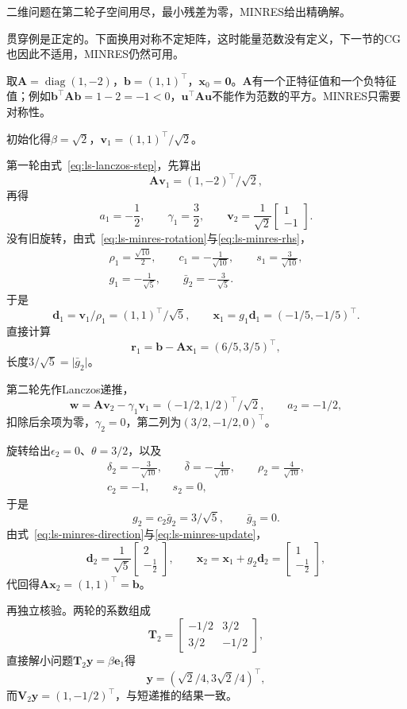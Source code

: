 二维问题在第二轮子空间用尽，最小残差为零，MINRES给出精确解。

贯穿例是正定的。下面换用对称不定矩阵，这时能量范数没有定义，下一节的CG也因此不适用，MINRES仍然可用。

\begin{example}[对称不定矩阵上的MINRES]
\label{ex:ls-minres-indefinite}
取$\bm A=\operatorname{diag}(1,-2)$，$\bm b=(1,1)^\top$，$\bm x_0=\bm0$。$\bm A$有一个正特征值和一个负特征值；例如$\bm b^\top\bm A\bm b=1-2=-1<0$，$\bm u^\top\bm A\bm u$不能作为范数的平方。MINRES只需要对称性。

初始化得$\beta=\sqrt2$，$\bm v_1=(1,1)^\top/\sqrt2$。

第一轮由式~\eqref{eq:ls-lanczos-step}，先算出
\[
 \bm A\bm v_1=(1,-2)^\top/\sqrt2 ,
\]
再得
\[
 a_1=-\frac12,\qquad \gamma_1=\frac32,\qquad \bm v_2=\frac1{\sqrt2}\begin{bmatrix}1\\-1\end{bmatrix}.
\]
没有旧旋转，由式~\eqref{eq:ls-minres-rotation}与\eqref{eq:ls-minres-rhs}，
\[
 \begin{gathered}
 \rho_1=\frac{\sqrt{10}}2,\qquad c_1=-\frac1{\sqrt{10}},\qquad s_1=\frac3{\sqrt{10}},\\
 g_1=-\frac1{\sqrt5},\qquad \bar g_2=-\frac3{\sqrt5} .
 \end{gathered}
\]
于是
\[
 \bm d_1=\bm v_1/\rho_1=(1,1)^\top/\sqrt5,\qquad \bm x_1=g_1\bm d_1=(-1/5,-1/5)^\top .
\]
直接计算
\[
 \bm r_1=\bm b-\bm A\bm x_1=(6/5,3/5)^\top ,
\]
长度$3/\sqrt5=\lvert\bar g_2\rvert$。

第二轮先作Lanczos递推，
\[
 \bm w=\bm A\bm v_2-\gamma_1\bm v_1=(-1/2,1/2)^\top/\sqrt2,\qquad a_2=-1/2 ,
\]
扣除后余项为零，$\gamma_2=0$，第二列为$(3/2,-1/2,0)^\top$。

旋转给出$\epsilon_2=0$、$\theta=3/2$，以及
\[
 \begin{gathered}
 \delta_2=-\frac3{\sqrt{10}},\qquad \bar\delta=-\frac4{\sqrt{10}},\qquad \rho_2=\frac4{\sqrt{10}},\\
 c_2=-1,\qquad s_2=0 ,
 \end{gathered}
\]
于是
\[
 g_2=c_2\bar g_2=3/\sqrt5,\qquad \bar g_3=0 .
\]
由式~\eqref{eq:ls-minres-direction}与\eqref{eq:ls-minres-update}，
\[
 \bm d_2=\frac1{\sqrt5}\begin{bmatrix}2\\-\tfrac12\end{bmatrix},\qquad
 \bm x_2=\bm x_1+g_2\bm d_2=\begin{bmatrix}1\\-\tfrac12\end{bmatrix},
\]
代回得$\bm A\bm x_2=(1,1)^\top=\bm b$。

再独立核验。两轮的系数组成
\[
 \bm T_2=\begin{bmatrix}-1/2&3/2\\3/2&-1/2\end{bmatrix},
\]
直接解小问题$\bm T_2\bm y=\beta\bm e_1$得
\[
 \bm y=(\sqrt2/4,3\sqrt2/4)^\top ,
\]
而$\bm V_2\bm y=(1,-1/2)^\top$，与短递推的结果一致。
\end{example}

